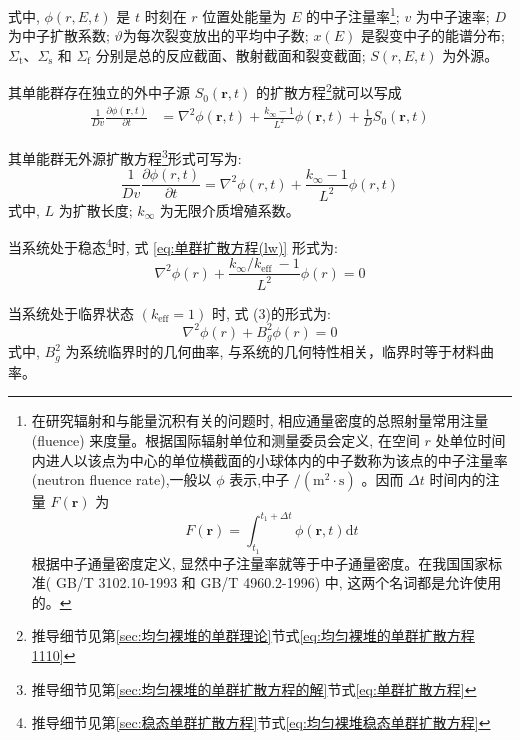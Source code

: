 \documentclass{Sichuan Normal University}
\begin{document}
式中, $\phi(r, E, t)$ 是 $t$ 时刻在 $r$ 位置处能量为 $E$ 的中子注量率\footnote{在研究辐射和与能量沉积有关的问题时, 相应通量密度的总照射量常用注量 (fluence) 来度量。根据国际辐射单位和测量委员会定义, 在空间 $r$ 处单位时间内进人以该点为中心的单位横截面的小球体内的中子数称为该点的中子注量率 (neutron fluence rate),一般以 $\phi$ 表示,中子 $/\left(\mathrm{m}^2 \cdot \mathrm{s}\right)$ 。因而 $\Delta t$ 时间内的注量 $F(\boldsymbol{r})$ 为
$$
F(\boldsymbol{r})=\int_{t_1}^{t_1+\Delta t} \phi(\boldsymbol{r}, t) \mathrm{d} t
$$
根据中子通量密度定义, 显然中子注量率就等于中子通量密度。在我国国家标准( GB/T 3102.10-1993 和 GB/T 4960.2-1996) 中, 这两个名词都是允许使用的。}; $v$ 为中子速率; $D$ 为中子扩散系数; $\vartheta$为每次裂变放出的平均中子数; $x(E)$ 是裂变中子的能谱分布; $\Sigma_{\mathrm{t}} 、 \Sigma_{\mathrm{s}}$ 和 $\Sigma_{\mathrm{f}}$ 分别是总的反应截面、散射截面和裂变截面; $S(r, E, t)$ 为外源。

其单能群存在独立的外中子源 $S_0(\boldsymbol{r}, t)$ 的扩散方程\footnote{推导细节见第\ref{sec:均匀裸堆的单群理论}节式\eqref{eq:均匀裸堆的单群扩散方程1110}}就可以写成
\begin{align}
\frac{1}{Dv} \frac{\partial \phi(\boldsymbol{r}, t)}{\partial t}&=\nabla^2 \phi(\boldsymbol{r}, t)+\frac{k_{\infty}-1}{L^2} \phi(\boldsymbol{r}, t)+\frac{1}{D}S_0(\boldsymbol{r}, t)
\end{align}

其单能群无外源扩散方程\footnote{推导细节见第\ref{sec:均匀裸堆的单群扩散方程的解}节式\eqref{eq:单群扩散方程}}形式可写为:
\begin{equation}
\frac{1}{D v} \frac{\partial \phi(r, t)}{\partial t}=\nabla^2 \phi(r, t)+\frac{k_{\infty}-1}{L^2} \phi(r, t)
\label{eq:单群扩散方程(lw)}
\end{equation}
式中, $L$ 为扩散长度; $k_{\infty}$ 为无限介质增殖系数。

当系统处于稳态\footnote{推导细节见第\ref{sec:稳态单群扩散方程}节式\eqref{eq:均匀裸堆稳态单群扩散方程}}时, 式 \eqref{eq:单群扩散方程(lw)} 形式为:
\begin{equation}
\nabla^2 \phi(r)+\frac{k_{\infty} / k_{\text {eff }}-1}{L^2} \phi(r)=0
\label{eq:均匀裸堆稳态单群扩散方程(lw)}
\end{equation}

当系统处于临界状态 $\left(k_{\mathrm{eff}}=1\right)$ 时, 式 (3)的形式为:
\begin{equation}
\nabla^2 \phi(r)+B_g^2 \phi(r)=0
\label{eq:均匀裸堆稳态单群扩散方程2(lw)}
\end{equation}
式中, $B_g^2$ 为系统临界时的几何曲率, 与系统的几何特性相关，临界时等于材料曲率。
\end{document}
